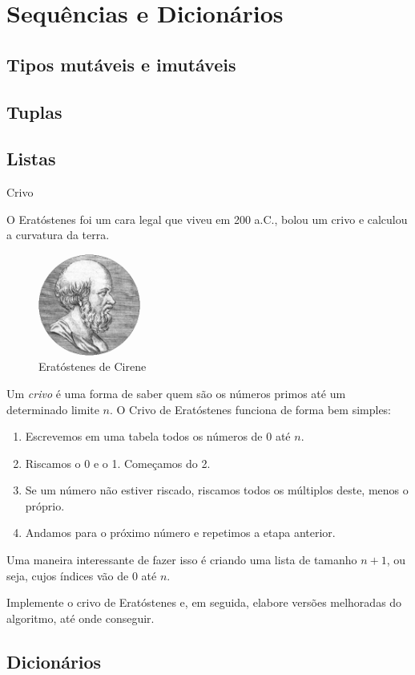 \chapter[c:sequencias]{Sequências e Dicionários}

    \section*{Tipos mutáveis e imutáveis}

    \section*{Tuplas}

    \section*{Listas}

    \begin{problem}{Crivo}
	
	O Eratóstenes foi um cara legal que viveu em 200 a.C., bolou um crivo e calculou a curvatura da terra.
	
    \begin{figure}[h]
        \medskip
        \centering
	    \includegraphics[width=0.3\textwidth]{figs/eratostenes.png}
        \caption{Eratóstenes de Cirene}
        \label{p:crivo}
    \end{figure}
	
	Um \textit{crivo} é uma forma de saber quem são os números primos até um determinado limite $n$. O Crivo de Eratóstenes funciona de forma bem simples:
	\begin{enumerate}
		\item Escrevemos em uma tabela todos os números de 0 até $n$.
		\item Riscamos o 0 e o 1. Começamos do 2.
		
		\item Se um número não estiver riscado, riscamos todos os múltiplos deste, menos o próprio.
		
		\item Andamos para o próximo número e repetimos a etapa anterior.		
	\end{enumerate}
	Uma maneira interessante de fazer isso é criando uma lista de tamanho $n + 1$, ou seja, cujos índices vão de 0 até $n$. \par

	\proposal Implemente o crivo de Eratóstenes e, em seguida, elabore versões melhoradas do algoritmo, até onde conseguir.

    \end{problem}

    \section*{Dicionários}

   